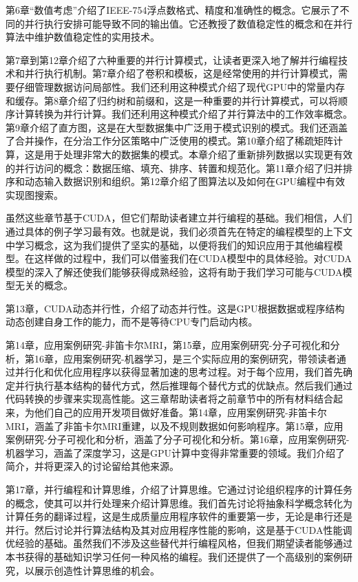 \documentclass[11pt]{ctexart}
\begin{document}
第6章“数值考虑”介绍了IEEE-754浮点数格式、精度和准确性的概念。它展示了不同的并行执行安排可能导致不同的输出值。它还教授了数值稳定性的概念和在并行算法中维护数值稳定性的实用技术。

第7章到第12章介绍了六种重要的并行计算模式，让读者更深入地了解并行编程技术和并行执行机制。第7章介绍了卷积和模板，这是经常使用的并行计算模式，需要仔细管理数据访问局部性。我们还利用这种模式介绍了现代GPU中的常量内存和缓存。第8章介绍了归约树和前缀和，这是一种重要的并行计算模式，可以将顺序计算转换为并行计算。我们还利用这种模式介绍了并行算法中的工作效率概念。第9章介绍了直方图，这是在大型数据集中广泛用于模式识别的模式。我们还涵盖了合并操作，在分治工作分区策略中广泛使用的模式。第10章介绍了稀疏矩阵计算，这是用于处理非常大的数据集的模式。本章介绍了重新排列数据以实现更有效的并行访问的概念：数据压缩、填充、排序、转置和规范化。第11章介绍了归并排序和动态输入数据识别和组织。第12章介绍了图算法以及如何在GPU编程中有效实现图搜索。

虽然这些章节基于CUDA，但它们帮助读者建立并行编程的基础。我们相信，人们通过具体的例子学习最有效。也就是说，我们必须首先在特定的编程模型的上下文中学习概念，这为我们提供了坚实的基础，以便将我们的知识应用于其他编程模型。在这样做的过程中，我们可以借鉴我们在CUDA模型中的具体经验。对CUDA模型的深入了解还使我们能够获得成熟经验，这将有助于我们学习可能与CUDA模型无关的概念。

第13章，CUDA动态并行性，介绍了动态并行性。这是GPU根据数据或程序结构动态创建自身工作的能力，而不是等待CPU专门启动内核。

第14章，应用案例研究-非笛卡尔MRI，第15章，应用案例研究-分子可视化和分析，第16章，应用案例研究-机器学习，是三个实际应用的案例研究，带领读者通过并行化和优化应用程序以获得显著加速的思考过程。对于每个应用，我们首先确定并行执行基本结构的替代方式，然后推理每个替代方式的优缺点。然后我们通过代码转换的步骤来实现高性能。这三章帮助读者将之前章节中的所有材料结合起来，为他们自己的应用开发项目做好准备。第14章，应用案例研究-非笛卡尔MRI，涵盖了非笛卡尔MRI重建，以及不规则数据如何影响程序。第15章，应用案例研究-分子可视化和分析，涵盖了分子可视化和分析。第16章，应用案例研究-机器学习，涵盖了深度学习，这是GPU计算中变得非常重要的领域。我们介绍了简介，并将更深入的讨论留给其他来源。

第17章，并行编程和计算思维，介绍了计算思维。它通过讨论组织程序的计算任务的概念，使其可以并行处理来介绍计算思维。我们首先讨论将抽象科学概念转化为计算任务的翻译过程，这是生成质量应用程序软件的重要第一步，无论是串行还是并行。然后讨论并行算法结构及其对应用程序性能的影响，这是基于CUDA性能调优经验的基础。虽然我们不涉及这些替代并行编程风格，但我们期望读者能够通过本书获得的基础知识学习任何一种风格的编程。我们还提供了一个高级别的案例研究，以展示创造性计算思维的机会。
\end{document}
